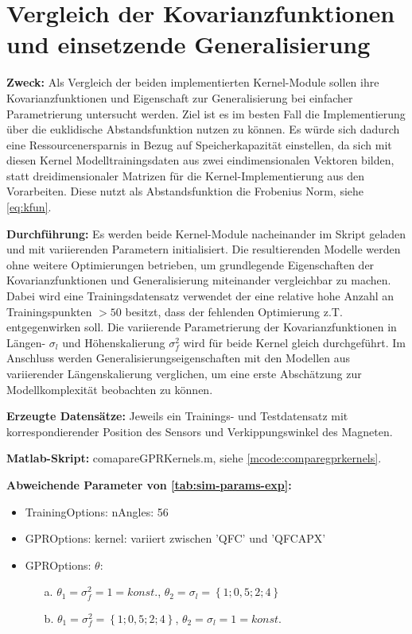 %

\section{Vergleich der Kovarianzfunktionen und einsetzende Generalisierung}\label{sec:exp1}

\textbf{Zweck:} Als Vergleich der beiden implementierten Kernel-Module sollen ihre Kovarianzfunktionen und Eigenschaft zur Generalisierung bei einfacher Parametrierung untersucht werden. Ziel ist es im besten Fall die Implementierung über die euklidische Abstandsfunktion nutzen zu können. Es würde sich dadurch eine Ressourcenersparnis in Bezug auf Speicherkapazität einstellen, da sich mit diesen Kernel Modelltrainingsdaten aus zwei eindimensionalen Vektoren bilden, statt dreidimensionaler Matrizen für die Kernel-Implementierung aus den Vorarbeiten. Diese nutzt als Abstandsfunktion die Frobenius Norm, siehe \autoref{eq:kfun}.


\clearpage


\textbf{Durchführung:} Es werden beide Kernel-Module nacheinander im Skript geladen und mit variierenden Parametern initialisiert. Die resultierenden Modelle werden ohne weitere Optimierungen betrieben, um grundlegende Eigenschaften der Kovarianzfunktionen und Generalisierung miteinander vergleichbar zu machen. Dabei wird eine Trainingsdatensatz verwendet der eine relative hohe Anzahl an Trainingspunkten $>50$ besitzt, dass der fehlenden Optimierung z.T. entgegenwirken soll. Die variierende Parametrierung der Kovarianzfunktionen in Längen- $\sigma_l$ und Höhenskalierung $\sigma_f^2$ wird für beide Kernel gleich durchgeführt. Im Anschluss werden Generalisierungseigenschaften mit den Modellen aus variierender Längenskalierung verglichen, um eine erste Abschätzung zur Modellkomplexität beobachten zu können.

\textbf{Erzeugte Datensätze:} Jeweils ein Trainings- und Testdatensatz mit korrespondierender Position des Sensors und Verkippungswinkel des Magneten.

\textbf{Matlab-Skript:} comapareGPRKernels.m, siehe \autoref{mcode:comparegprkernels}.

\textbf{Abweichende Parameter von \autoref{tab:sim-params-exp}:}

\begin{itemize}
\item TrainingOptions: nAngles: 56
\item GPROptions: kernel: variiert zwischen 'QFC' und 'QFCAPX'
\item GPROptions: $\theta$:
\begin{itemize}
\item[a.] $\theta_1 =\sigma_f^2 = 1 = konst.$, $\theta_2 = \sigma_l = \left\{ 1; 0,5; 2; 4 \right\}$
\item[b.] $\theta_1 =\sigma_f^2 = \left\{ 1; 0,5; 2; 4 \right\}$, $\theta_2 = \sigma_l = 1 = konst.$
\end{itemize}
\end{itemize}


